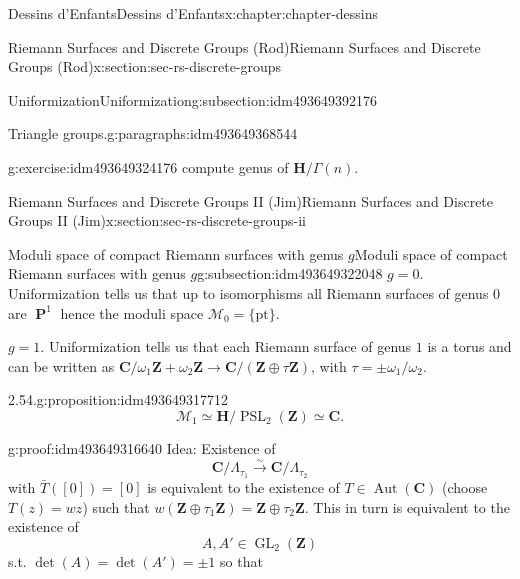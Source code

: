 \documentclass[oneside,10pt,]{book}
\numberwithin{equation}{section}
\newcommand{\lb}{[}
\newcommand{\rb}{]}
\newcommand{\ZZ}{\mathbf{Z}}
\newcommand{\CC}{\mathbf{C}}
\newcommand{\HH}{\mathbf{H}}
\DeclareMathOperator{\PP}{\mathbf{P}}
\DeclareMathOperator{\Aut}{Aut}
\DeclareMathOperator{\GL}{GL}
\DeclareMathOperator{\PSL}{PSL}
\begin{document}
\begin{chapterptx}{Dessins d'Enfants}{}{Dessins d'Enfants}{}{}{x:chapter:chapter-dessins}
\begin{sectionptx}{Riemann Surfaces and Discrete Groups (Rod)}{}{Riemann Surfaces and Discrete Groups (Rod)}{}{}{x:section:sec-rs-discrete-groups}
\begin{subsectionptx}{Uniformization}{}{Uniformization}{}{}{g:subsection:idm493649392176}
\begin{paragraphs}{Triangle groups.}{g:paragraphs:idm493649368544}
\begin{inlineexercise}{}{g:exercise:idm493649324176}
compute genus of \(\HH/\Gamma(n)\).%
\end{inlineexercise}
\end{paragraphs}%
\end{subsectionptx}
\end{sectionptx}
%
%
\typeout{************************************************}
\typeout{************************************************}
%
\begin{sectionptx}{Riemann Surfaces and Discrete Groups II (Jim)}{}{Riemann Surfaces and Discrete Groups II (Jim)}{}{}{x:section:sec-rs-discrete-groups-ii}
%
%
\typeout{************************************************}
\typeout{************************************************}
%
\begin{subsectionptx}{Moduli space of compact Riemann surfaces with genus \(g\)}{}{Moduli space of compact Riemann surfaces with genus \(g\)}{}{}{g:subsection:idm493649322048}
\(g =0\). Uniformization tells us that up to isomorphisms all Riemann surfaces of genus \(0\) are \(\PP^1\) hence the moduli space \(\mathcal M _0  = \{\text{pt}\}\).%
\par
\(g = 1\). Uniformization tells us that each Riemann surface of genus \(1\) is a torus and can be written as \(\CC/ \omega_1\ZZ+ \omega_2\ZZ \to \CC/(\ZZ \oplus \tau \ZZ)\), with \(\tau = \pm \omega_1/\omega_2\).%
\begin{proposition}{2.54.}{}{g:proposition:idm493649317712}%
%
\begin{equation*}
\mathcal M_1 \simeq \HH/ \PSL_2(\ZZ) \simeq \CC\text{.}
\end{equation*}
%
\end{proposition}
\begin{proofptx}{}{g:proof:idm493649316640}
Idea: Existence of%
\begin{equation*}
\CC/ \Lambda_{\tau_1} \xrightarrow{\sim} \CC/\Lambda_{\tau_2}
\end{equation*}
with \(\bar T (\lb 0 \rb) = \lb 0 \rb\) is equivalent to the existence of \(T \in \Aut(\CC)\) (choose \(T(z) = wz\)) such that \(w(\ZZ\oplus \tau_1 \ZZ) = \ZZ\oplus \tau_2\ZZ\). This in turn is equivalent to the existence of%
\begin{equation*}
A,A' \in \GL_2(\ZZ)
\end{equation*}
s.t. \(\det (A) = \det(A') = \pm 1\) so that%
\begin{equation*}

\end{equation*}
\end{proofptx}
\end{subsectionptx}
\end{sectionptx}
\end{chapterptx}
\end{document}
